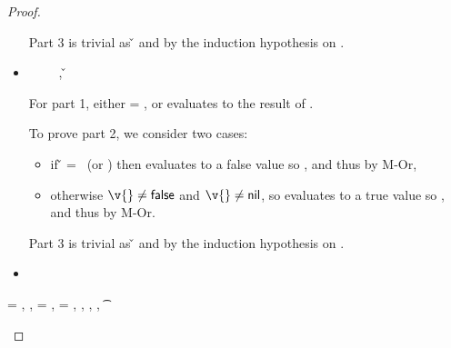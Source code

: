 \begin{lemma}
\begin{proof}
\begin{case}[T-If]
\begin{itemize}
\begin{subcase}[B-IfTrue]
              Part 3 is trivial as
              \opsem {\openv{}} {} {\v{}}
              and {\judgementtwo{}{\hastype{\v{}}{\t{}}}} by the induction hypothesis on {}.


      \end{subcase}
    \item[]
      \begin{subcase}[B-IfFalse]
        \opsem {\openv{}} {} {\false}
        \ \ \ \ 
        \opsem {\openv{}} {} {\nil},
        \opsem {\openv{}} {} {\v{}}

              For part 1, either \object{} = \emptyobject{}, or \e{} evaluates to the
              result of \e{3}.

              To prove part 2, we consider two cases:
              \begin{itemize}
                \item if \v{} = \false\ (or \nil)
                  then  evaluates to a false value so {}, and thus
                  {\satisfies{\openv{}}{\orprop {\elseprop {\prop{2}}} {\elseprop {\prop{3}}}}} by M-Or, 
                \item otherwise
                  ${\v{}} \not= {\false}$ and
                  ${\v{}} \not= {\nil}$,
                  so  evaluates to a true value so {}, and thus
                  {\satisfies{\openv{}}{\orprop {\thenprop {\prop{2}}} {\thenprop {\prop{3}}}}} by M-Or.
              \end{itemize}

              Part 3 is trivial as
              \opsem {\openv{}} {} {\v{}}
              and {\judgementtwo{}{\hastype{\v{}}{\t{}}}} by the induction hypothesis on {}.
      \end{subcase}
    \item[]
      \begin{subcase}[BE-If]
      \end{subcase}
  \end{itemize}
\end{case}

\begin{case}[T-Let]
  \e{} = { {} {}},
  \judgement {\propenv{}} { {\s{}}} { {}}
             {\object{1}},
             \propp{} = {\impprop {\notprop {\falsy{}} {\x{}}} {}},
             \proppp{} = {\impprop {\isprop {\falsy{}} {\x{}}} {\elseprop {\prop{1}}}},
  \judgement
       {\propenv{}, {\isprop {\s{}} {\x{}}},
         {\propp{}},
         {\proppp{}}}
             { {\t{}}} {\filterset {\thenprop {\prop{}}} {\elseprop {\prop{}}}}
             {\object{}} 



\end{case}
\end{proof}
\end{lemma}

